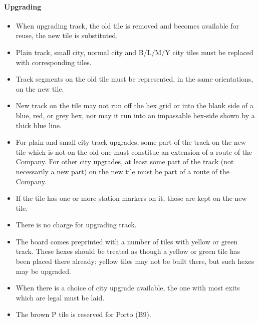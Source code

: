 \documentclass[a4paper,twocolumn]{article}
\begin{document}
\paragraph{Upgrading}
\begin{itemize}
	\item When upgrading track, the old tile is removed and becomes available
	for reuse, the new tile is substituted.
	\item Plain track, small city, normal city and B/L/M/Y city tiles must be
	replaced with corresponding tiles.
	\item Track segments on the old tile must be represented, in the same
	orientations, on the new tile.
	\item New track on the tile may not run off the hex grid or into the blank
	side of a blue, red, or grey hex, nor may it run into an impassable hex-side
	shown by a thick blue line.
	\item For plain and small city track upgrades, some part of the track on the
	new tile which is not on the old one must constitue an extension of a route
	of the Company. For other city upgrades, at least some part of the track
	(not necessarily a new part) on the new tile must be part of a route of the
	Company.
	\item If the tile has one or more station markers on it, those are kept on
	the new tile.
	\item There is no charge for upgrading track.
	\item The board comes preprinted with a number of tiles with yellow or green
	track. These hexes should be treated as though a yellow or green tile has
	been placed there already; yellow tiles may not be built there, but such
	hexes may be upgraded.
	\item When there is a choice of city upgrade available, the one with most
	exits which are legal must be laid.
	\item The brown P tile is reserved for Porto (B9).
\end{itemize}
\end{document}
